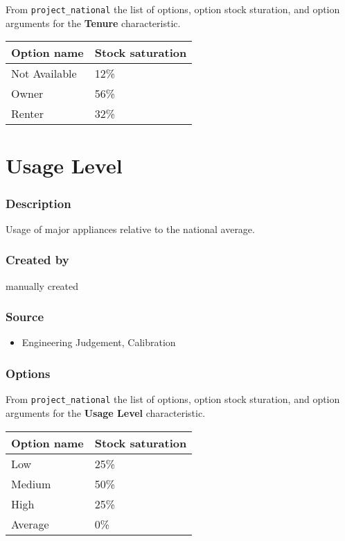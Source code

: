 From \texttt{project\_national} the list of options, option stock
sturation, and option arguments for the \textbf{Tenure} characteristic.

\begin{longtable}[]{@{}ll@{}}
\toprule\noalign{}
Option name & Stock saturation \\
\midrule\noalign{}
\endhead
\bottomrule\noalign{}
\endlastfoot
Not Available & 12\% \\
Owner & 56\% \\
Renter & 32\% \\
\end{longtable}

\section{Usage Level}\label{usage_level}

\subsubsection{Description}\label{description-141}

Usage of major appliances relative to the national average.

\subsubsection{Created by}\label{created-by-142}

manually created

\subsubsection{Source}\label{source-144}

\begin{itemize}
 
\item
  Engineering Judgement, Calibration
\end{itemize}

\subsubsection{Options}\label{options-145}

From \texttt{project\_national} the list of options, option stock
sturation, and option arguments for the \textbf{Usage Level}
characteristic.

\begin{longtable}[]{@{}ll@{}}
\toprule\noalign{}
Option name & Stock saturation \\
\midrule\noalign{}
\endhead
\bottomrule\noalign{}
\endlastfoot
Low & 25\% \\
Medium & 50\% \\
High & 25\% \\
Average & 0\% \\
\end{longtable}

